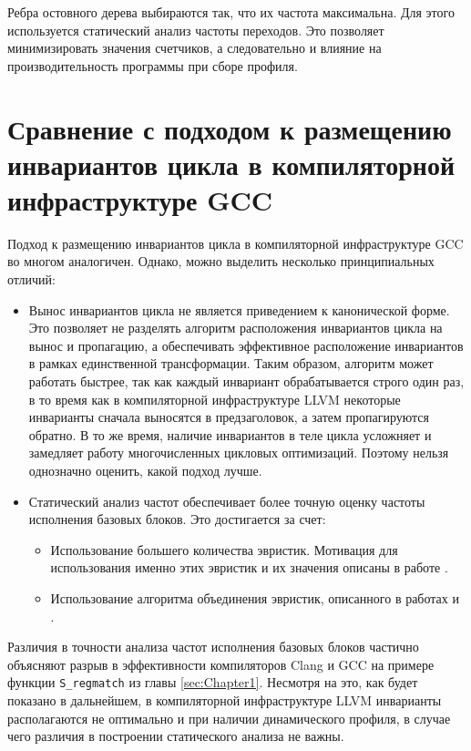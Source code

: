 Ребра остовного дерева выбираются так, что их частота максимальна.
Для этого используется статический анализ частоты переходов.
Это позволяет минимизировать значения счетчиков, а следовательно и влияние на производительность программы при сборе профиля.

\section{Сравнение с подходом к размещению инвариантов цикла в компиляторной инфраструктуре GCC}

Подход к размещению инвариантов цикла в компиляторной инфраструктуре GCC во многом аналогичен.
Однако, можно выделить несколько принципиальных отличий:
\begin{itemize}
    \item Вынос инвариантов цикла не является приведением к канонической форме.
        Это позволяет не разделять алгоритм расположения инвариантов цикла на вынос и пропагацию, а обеспечивать эффективное расположение инвариантов в рамках единственной трансформации.
        Таким образом, алгоритм может работать быстрее, так как каждый инвариант обрабатывается строго один раз, в то время как в компиляторной инфраструктуре LLVM некоторые инварианты сначала выносятся в предзаголовок, а затем пропагируются обратно.
        В то же время, наличие инвариантов в теле цикла усложняет и замедляет работу многочисленных цикловых оптимизаций.
        Поэтому нельзя однозначно оценить, какой подход лучше.
    \item Статический анализ частот обеспечивает более точную оценку частоты исполнения базовых блоков.
        Это достигается за счет:
    \begin{itemize}
        \item Использование большего количества эвристик.
            Мотивация для использования именно этих эвристик и их значения описаны в работе \cite{Ball_Larus_1993}.
        \item Использование алгоритма объединения эвристик, описанного в работах \cite{Youfeng_Wu_Larus} и \cite{Calder_Grunwald_Lindsay_Martin_Mozer_Zorn_1995}.
    \end{itemize}
\end{itemize}

Различия в точности анализа частот исполнения базовых блоков частично объясняют разрыв в эффективности компиляторов Clang и GCC на примере функции \texttt{S\_regmatch} из главы \ref{sec:Chapter1}.
Несмотря на это, как будет показано в дальнейшем, в компиляторной инфраструктуре LLVM инварианты располагаются не оптимально и при наличии динамического профиля, в случае чего различия в построении статического анализа не важны.

\newpage

